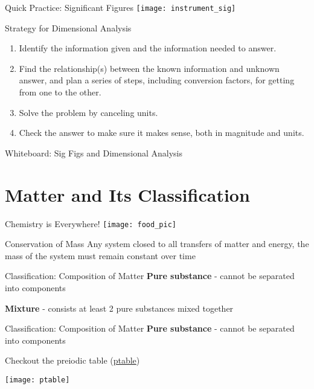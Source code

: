 \documentclass[11pt]{beamer}
\begin{document}
\begin{frame}{Quick Practice: Significant Figures}
  \centering
  \texttt{[image: instrument\_sig]}
\end{frame}

\begin{frame}{Strategy for Dimensional Analysis}
  \begin{enumerate}
  \item Identify the information given and the
    information needed to answer.
  \item Find the relationship(s) between the known
    information and unknown answer, and plan a series
    of steps, including conversion factors, for getting from
    one to the other.
  \item Solve the problem by canceling units.
  \item Check the answer to make sure it makes sense,
    both in magnitude and units.
  \end{enumerate}
\end{frame}

\begin{frame}{Whiteboard: Sig Figs and Dimensional Analysis}
\end{frame}

\section{Matter and Its Classification}

\begin{frame}{Chemistry is Everywhere!}
  \centering
  \texttt{[image: food\_pic]}
\end{frame}

\begin{frame}{Conservation of Mass}
  Any system closed to all transfers of matter and energy, the mass
  of the system must remain constant over time
\end{frame}

\begin{frame}{Classification: Composition of Matter}
  \textbf{Pure substance} - cannot be separated into components

  \textbf{Mixture} - consists at least 2 pure substances mixed
  together
\end{frame}

\begin{frame}{Classification: Composition of Matter}
  \textbf{Pure substance} - cannot be separated into components
  
  Checkout the preiodic table (\href{https://ptable.com}{ptable})
  
  \centering
  \texttt{[image: ptable]}
\end{frame}
\end{document}
